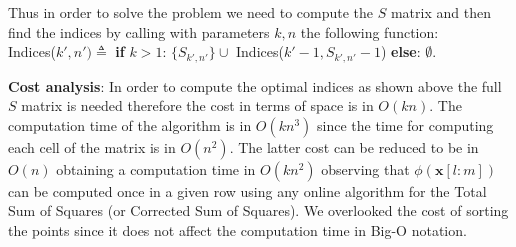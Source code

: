 \documentclass[a4paper]{article}
\begin{document}
\begin{enumerate}
    Thus in order to solve the problem we need to compute the $S$ matrix and
    then find the indices by calling with parameters $k, n$ the following
    function: \\ Indices($k', n')\triangleq $\textbf{ if} $k > 1$:
    $\{S_{k',n'}\} \cup$
    Indices($k'-1, S_{k',n'} - 1$) \textbf{else}: $\emptyset $.

    \textbf{Cost analysis}: In order to compute the optimal indices as shown
    above the full $S$ matrix is needed therefore the cost in terms of space is
    in $O(kn)$. The computation time of the algorithm is in $O(kn^3)$ since
    the time for computing each cell of the matrix is in $O(n^2)$. The latter
    cost can be reduced to be in $O(n)$ obtaining a computation time in
    $O(kn^2)$ observing that $\phi(\mathbf{x}[l:m])$ can be computed once in a
    given row using any online algorithm for the Total Sum of Squares (or
    Corrected Sum of Squares). We overlooked the cost of sorting the points
    since it does not affect the computation time in Big-O notation.
\end{enumerate}

    \iffalse
    \begin{figure}[!htbp]
    \begin{center}
    \texttt{[image: house.png]}
    \end{center}
    \caption{\textit{The house subgraph}}\label{house}
    \end{figure}
    \fi
\end{document}
